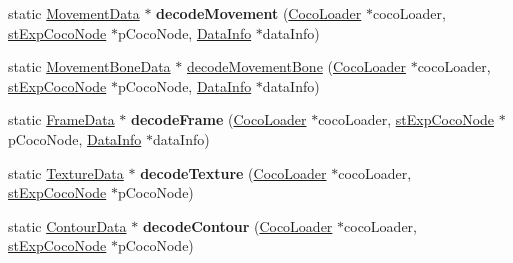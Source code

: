 \begin{DoxyCompactItemize}
\item 
\mbox{\label{classcocostudio_1_1DataReaderHelper_a3669c7c1baf558d2b744251a21fcbf55}} 
static \hyperlink{classcocostudio_1_1MovementData}{Movement\+Data} $\ast$ {\bfseries decode\+Movement} (\hyperlink{classcocostudio_1_1CocoLoader}{Coco\+Loader} $\ast$coco\+Loader, \hyperlink{structcocostudio_1_1stExpCocoNode}{st\+Exp\+Coco\+Node} $\ast$p\+Coco\+Node, \hyperlink{structcocostudio_1_1DataReaderHelper_1_1__DataInfo}{Data\+Info} $\ast$data\+Info)
\item 
static \hyperlink{classcocostudio_1_1MovementBoneData}{Movement\+Bone\+Data} $\ast$ \hyperlink{classcocostudio_1_1DataReaderHelper_a66a4cce95a6b7cfbc4cbf89a962829c0}{decode\+Movement\+Bone} (\hyperlink{classcocostudio_1_1CocoLoader}{Coco\+Loader} $\ast$coco\+Loader, \hyperlink{structcocostudio_1_1stExpCocoNode}{st\+Exp\+Coco\+Node} $\ast$p\+Coco\+Node, \hyperlink{structcocostudio_1_1DataReaderHelper_1_1__DataInfo}{Data\+Info} $\ast$data\+Info)
\item 
\mbox{\label{classcocostudio_1_1DataReaderHelper_aa2d041e5ba2f4a15c2728ef68bf60753}} 
static \hyperlink{classcocostudio_1_1FrameData}{Frame\+Data} $\ast$ {\bfseries decode\+Frame} (\hyperlink{classcocostudio_1_1CocoLoader}{Coco\+Loader} $\ast$coco\+Loader, \hyperlink{structcocostudio_1_1stExpCocoNode}{st\+Exp\+Coco\+Node} $\ast$p\+Coco\+Node, \hyperlink{structcocostudio_1_1DataReaderHelper_1_1__DataInfo}{Data\+Info} $\ast$data\+Info)
\item 
\mbox{\label{classcocostudio_1_1DataReaderHelper_a4595ad8ddfbd21da22095fd84260a288}} 
static \hyperlink{classcocostudio_1_1TextureData}{Texture\+Data} $\ast$ {\bfseries decode\+Texture} (\hyperlink{classcocostudio_1_1CocoLoader}{Coco\+Loader} $\ast$coco\+Loader, \hyperlink{structcocostudio_1_1stExpCocoNode}{st\+Exp\+Coco\+Node} $\ast$p\+Coco\+Node)
\item 
\mbox{\label{classcocostudio_1_1DataReaderHelper_ae6336766e2b9cb82e3ca63381d50d8d6}} 
static \hyperlink{classcocostudio_1_1ContourData}{Contour\+Data} $\ast$ {\bfseries decode\+Contour} (\hyperlink{classcocostudio_1_1CocoLoader}{Coco\+Loader} $\ast$coco\+Loader, \hyperlink{structcocostudio_1_1stExpCocoNode}{st\+Exp\+Coco\+Node} $\ast$p\+Coco\+Node)

\end{DoxyCompactItemize}
